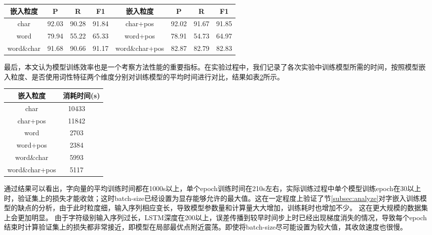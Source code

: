 \begin{table}[H]
    \centering
    \begin{tabular}{cccccccc}
        \toprule
        嵌入粒度 & P  & R  & F1 & 嵌入粒度 & P & R & F1\\
        \midrule
        char & 92.03 & 90.28 & 91.84 & char+pos & 92.02 &  91.67 & 91.85\\
        word & 79.94 & 55.22 & 65.33 & word+pos & 78.91 & 54.73 & 64.97\\
        word\&char & 91.68 & 90.66 & 91.17 & word\&char+pos & 82.87 & 82.79 & 82.83\\
        \bottomrule
    \end{tabular}
    \label{tab:overall_comparison}
\end{table}


最后，本文认为模型训练效率也是一个考察方法性能的重要指标。在实验过程中，我们记录了各次实验中训练模型所需的时间，按照模型嵌入粒度、是否使用词性特征两个维度分别对训练模型的平均时间进行对比，结果如表\ref{tab:train_time}所示。

\begin{table}[H]
    \centering
    \begin{tabular}{ccc}
        \toprule
        嵌入粒度 & \multicolumn{2}{c}{消耗时间(s)}\\
        \midrule
        char  & 10433\\
        char+pos & 11842\\
        word  & 2703 \\
        word+pos  & 2384\\
        word\&char  & 5993\\
        word\&char+pos  & 5117 \\
        \bottomrule
    \end{tabular}
    \label{tab:train_time}
\end{table}

通过结果可以看出，字向量的平均训练时间都在1000s以上，单个epoch训练时间在210s左右，实际训练过程中单个模型训练epoch在30以上时，验证集上的损失才能收敛；这时batch-size已经设置为显存能够允许的最大值。这在一定程度上验证了节\ref{subsec:analyze}对字嵌入训练模型的缺点的分析，由于此时粒度细，输入序列相应变长，导致模型参数量和计算量大大增加，训练耗时也增加不少。
这在更大规模的数据集上会更加明显。
由于字符级别输入序列过长，LSTM深度在200以上，误差传播到较早时间步上时已经出现梯度消失的情况，导致每个epoch结束时计算验证集上的损失都非常接近，即模型在局部最优点附近震荡。即使将batch-size尽可能设置为较大值，其收敛速度也很慢。

